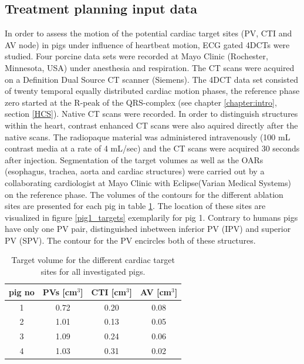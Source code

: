\documentclass[type=dr, dr=rernat, accentcolor=tud7b,colorbacktitle, bigchapter, openright, twoside, 12pt ]{tudthesis}
\begin{document}
\subsection{Treatment planning input data}
In order to assess the motion of the potential cardiac target sites (PV, CTI and AV node) in pigs under influence of heartbeat motion, 
ECG gated 4DCTs were studied. Four porcine data sets were recorded at Mayo Clinic (Rochester, Minnesota, USA) under anesthesia and respiration.  
The CT scans were acquired on a Definition Dual Source CT scanner (Siemens). The 4DCT data set consisted of twenty temporal equally distributed 
cardiac motion phases, the reference phase zero started at the R-peak of the QRS-complex (see chapter \ref{chapter:intro}, section \ref{HCS}). 
Native CT scans were recorded. In order to distinguish structures within the heart, contrast enhanced CT scans were also aquired directly 
after the native scans. The radiopaque material was administered intravenously (100 mL contrast media at a rate of 4 mL/sec) and the CT scans 
were acquired 30 seconds after injection.
Segmentation of the target volumes as well as the OARs (esophagus, trachea, aorta and cardiac structures) were carried out by a collaborating 
cardiologist at Mayo Clinic with Eclipse\texttrademark (Varian Medical Systems) on the reference phase. The volumes of the contours for the 
different ablation sites are presented for each pig in table \ref{tab:volume:mayo:porcine}. The location of these sites are visualized in 
figure \ref{pig1_targets} exemplarily for pig 1. Contrary to humans pigs have only one PV pair, distinguished inbetween inferior PV (IPV) and 
superior PV (SPV). The contour for the PV encircles both of these structures. 


\begin{table}[htbp]
  \centering
  \caption{Target volume for the different cardiac target sites for all investigated pigs.}
  \begin{tabular}{|c|c|c|c|}
    \hline\hline
    pig no\rule{0pt}{2.6ex}\rule[-1.2ex]{0pt}{0pt} & PVs [cm$^{3}$] & CTI [cm$^{3}$] & AV [cm$^{3}$]\\
    \hline
    1 & 0.72 & 0.20 & 0.08 \\
    2 & 1.01 & 0.13 & 0.05 \\
    3 & 1.09 & 0.24 & 0.06 \\
    4 & 1.03 & 0.31 & 0.02 \\
    \hline\hline
  \end{tabular}
  \label{tab:volume:mayo:porcine}
\end{table}
\end{document}
